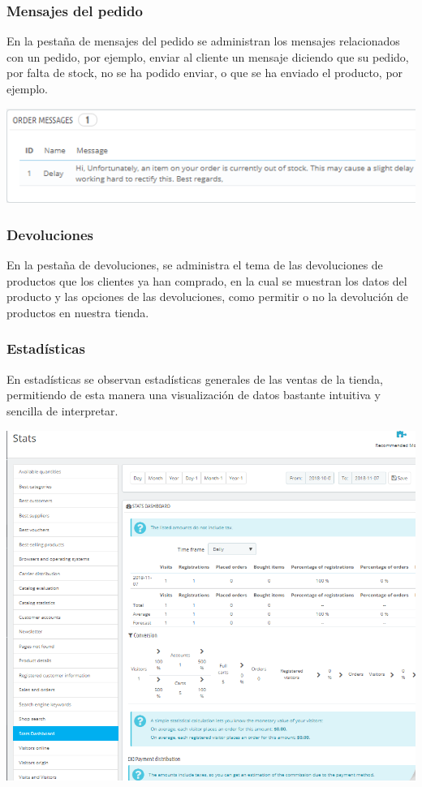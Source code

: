 \documentclass{article}
\begin{document}
\subsubsection{Mensajes del pedido}

En la pestaña de mensajes del pedido  se administran los mensajes relacionados con un pedido, por ejemplo, enviar al cliente un mensaje diciendo que su pedido, por falta de stock, no se ha podido enviar, o que se ha enviado el producto, por ejemplo.

\begin{center}
\includegraphics[scale=0.6]{images/mensajes.png}
\end{center}

\subsubsection{Devoluciones}

En la pestaña de devoluciones, se administra el tema de las devoluciones de productos que los clientes ya han comprado, en la cual se muestran los datos del producto y las opciones de las devoluciones, como permitir o no la devolución de productos en nuestra tienda.

\subsubsection{Estadísticas}

En estadísticas se observan estadísticas generales de las ventas de la tienda, permitiendo de esta manera una visualización de datos bastante intuitiva y sencilla de interpretar.

\begin{center}
\includegraphics[scale=0.3]{images/stats.png}
\end{center}
\end{document}
